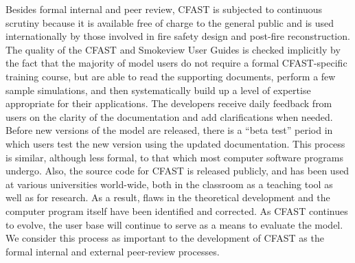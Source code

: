 \documentclass[12pt]{book}
\begin{document}
Besides formal internal and peer review, CFAST is subjected to continuous scrutiny because it is available free of charge to the general public and is used internationally by those involved in fire safety design and post-fire reconstruction. The quality of the CFAST and Smokeview User Guides is checked implicitly by the fact that the majority of model users do not require a formal CFAST-specific training course, but are able to read the supporting documents, perform a few sample simulations, and then systematically build up a level of expertise appropriate for their applications. The developers receive daily feedback from users on the clarity of the documentation and add clarifications when needed. Before new versions of the model are released, there is a  ``beta test'' period in which users test the new version using the updated documentation. This process is similar, although less formal, to that which most computer software programs undergo. Also, the source code for CFAST is released publicly, and has been used at various universities world-wide, both in the classroom as a teaching tool as well as for research. As a result, flaws in the theoretical development and the computer program itself have been identified and corrected. As CFAST continues to evolve, the user base will continue to serve as a means to evaluate the model. We consider this process as important to the development of CFAST as the formal internal and external peer-review processes.

\backmatter



\label{last_page}
\end{document}
